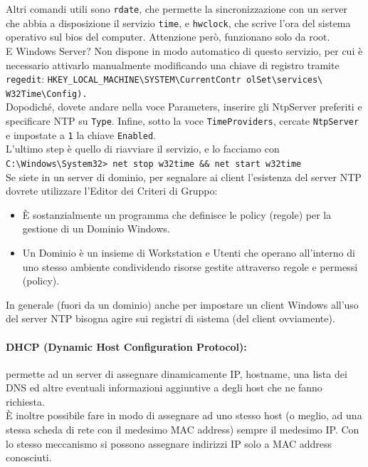 \documentclass[a4paper]{report}
\newcommand\tab[1][1cm]{\hspace*{#1}}
\begin{document}
Altri comandi utili sono \texttt{rdate}, che permette la sincronizzazione con un server che abbia a disposizione il servizio \texttt{time}, e \texttt{hwclock}, che scrive l'ora del sistema operativo sul bios del computer. Attenzione però, funzionano solo da root.\\
E Windows Server? Non dispone in modo automatico di questo servizio, per cui è necessario attivarlo manualmente modificando una chiave di registro tramite \texttt{regedit}: \texttt{HKEY\_LOCAL\_MACHINE\textbackslash SYSTEM\textbackslash CurrentContr
olSet\textbackslash services\textbackslash\\W32Time\textbackslash Config).}\\
Dopodiché, dovete andare nella voce Parameters, inserire gli
NtpServer preferiti e specificare NTP su \texttt{Type}. Infine, sotto la voce \texttt{TimeProviders}, cercate
\texttt{NtpServer} e impostate a \texttt{1} la chiave \texttt{Enabled}.\\
L'ultimo step è quello di riavviare il servizio, e lo facciamo con\\
\tab\texttt{C:\textbackslash Windows\textbackslash System32> net stop w32time \&\& net start w32time}\\
Se siete in un server di dominio, per segnalare ai client l'esistenza del
server NTP dovrete utilizzare l'Editor dei Criteri di Gruppo:
\begin{itemize}
\item È sostanzialmente un programma che definisce le policy (regole) per la gestione di
un Dominio Windows.
\item Un Dominio è un insieme di Workstation e Utenti che operano all'interno di uno
stesso ambiente condividendo risorse gestite attraverso regole e permessi (policy).
\end{itemize}
In generale (fuori da un dominio) anche per impostare un client Windows
all'uso del server NTP bisogna agire sui registri di sistema (del client
ovviamente).\\
\paragraph{DHCP (Dynamic Host Configuration Protocol):} permette ad un server di assegnare dinamicamente
IP, hostname, una lista dei DNS ed altre eventuali
informazioni aggiuntive a degli host che ne fanno
richiesta.\\ È inoltre possibile fare in modo di assegnare ad uno
stesso host (o meglio, ad una stessa scheda di rete
con il medesimo MAC address) sempre il medesimo
IP. Con lo stesso meccanismo si possono assegnare
indirizzi IP solo a MAC address conosciuti.\\
\end{document}
